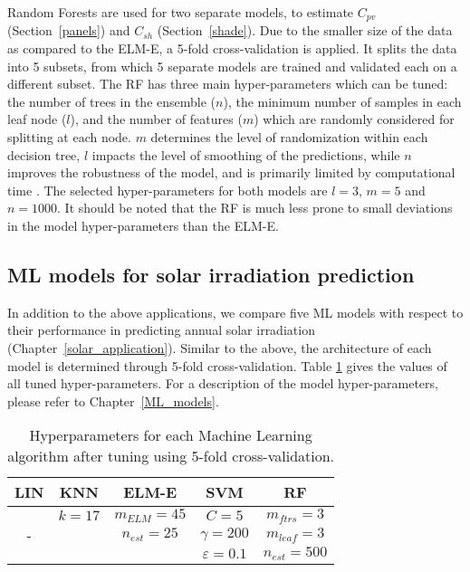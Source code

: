 Random Forests are used for two separate models, to estimate $C_{\mathit{pv}}$ (Section~\ref{panels}) and $C_{sh}$ (Section~\ref{shade}). Due to the smaller size of the data as compared to the ELM-E, a 5-fold cross-validation is applied. It splits the data into 5 subsets, from which 5 separate models are trained and validated each on a different subset. 
The RF has three main hyper-parameters which can be tuned: the number of trees in the ensemble ($n$), the minimum number of samples in each leaf node ($l$), and the number of features ($m$) which are randomly considered for splitting at each node. $m$ determines the level of randomization within each decision tree, $l$ impacts the level of smoothing of the predictions, while $n$ improves the robustness of the model, and is primarily limited by computational time \cite{breiman_random_2001}.
The selected hyper-parameters for both models are  $l = 3$, $m = 5$ and $n = 1000$. It should be noted that the RF is much less prone to small deviations in the model hyper-parameters than the ELM-E.

\subsection*{ML models for solar irradiation prediction}
\label{app:tune_irrad}

In addition to the above applications, we compare five ML models with respect to their performance in predicting annual solar irradiation (Chapter~\ref{solar_application}). Similar to the above, the architecture of each model is determined through 5-fold cross-validation. Table \ref{tab:chile_hyperparams} gives the values of all tuned hyper-parameters. For a description of the model hyper-parameters, please refer to Chapter~\ref{ML_models}.

\begin{table}[tb]
\centering
\footnotesize
\caption{Hyperparameters for each Machine Learning algorithm after tuning using 5-fold cross-validation.}
\label{tab:chile_hyperparams}
\begin{tabular}{ccccc}
\hline
\textbf{LIN}       & \textbf{KNN}      & \textbf{ELM-E}     & \textbf{SVM}     & \textbf{RF}         \\\hline
\multirow{3}{*}{-} & $k = 17$   & $m_{ELM} = 45$ & $C = 5 $  & $m_{ftrs} = 3$  \\
                   & \multirow{2}{*}{} & $n_{est} = 25$ &  $\gamma = 200$ & $m_{leaf} = 3$  \\
                   &                   &                    & $\varepsilon = 0.1$ & $n_{est} = 500$\\
\hline
\end{tabular}
\end{table}

